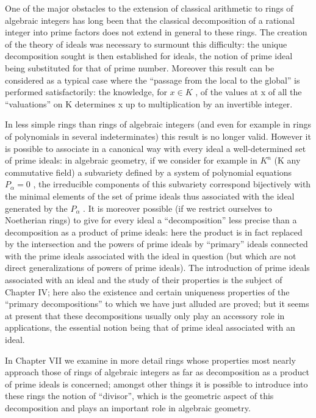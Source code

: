 One of the major obstacles to the extension of classical arithmetic to rings of algebraic integers has long been that the classical decomposition of a rational integer into prime factors does not extend in general to these rings. The creation of the theory of ideals was necessary to surmount this difficulty: the unique decomposition sought is then established for ideals, the notion of prime ideal being substituted for that of prime number. Moreover this result can be considered as a typical case where the ``passage from the local to the global'' is performed satisfactorily: the knowledge, for \(x \in K\) , of the values at x of all the ``valuations'' on K determines x up to multiplication by an invertible integer.

In less simple rings than rings of algebraic integers (and even for example in rings of polynomials in several indeterminates) this result is no longer valid. However it is possible to associate in a canonical way with every ideal a well-determined set of prime ideals: in algebraic geometry, if we consider for example in \(K^{n}\) (K any commutative field) a subvariety defined by a system of polynomial equations \(P_{\alpha}=0\) , the irreducible components of this subvariety correspond bijectively with the minimal elements of the set of prime ideals thus associated with the ideal generated by the \(P_{\alpha}\) . It is moreover possible (if we restrict ourselves to Noetherian rings) to give for every ideal a ``decomposition'' less precise than a decomposition as a product of prime ideals: here the product is in fact replaced by the intersection and the powers of prime ideals by ``primary'' ideals connected with the prime ideals associated with the ideal in question (but which are not direct generalizations of powers of prime ideals). The introduction of prime ideals associated with an ideal and the study of their properties is the subject of Chapter IV; here also the existence and certain uniqueness properties of the ``primary decompositions'' to which we have just alluded are proved; but it seems at present that these decompositions usually only play an accessory role in applications, the essential notion being that of prime ideal associated with an ideal.

In Chapter VII we examine in more detail rings whose properties most nearly approach those of rings of algebraic integers as far as decomposition as a product of prime ideals is concerned; amongst other things it is possible to introduce into these rings the notion of ``divisor'', which is the geometric aspect of this decomposition and plays an important role in algebraic geometry.

